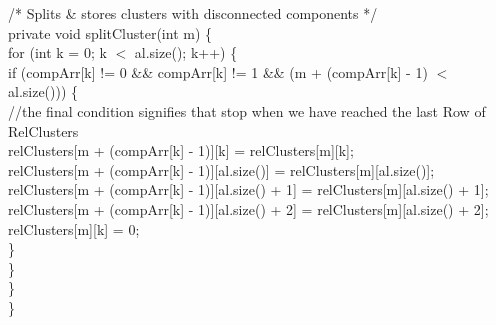 \begin{ttfamily   }
\begin{scriptsize}
    \noindent /*
      Splits \& stores clusters with disconnected components 
     */\\
    private void splitCluster(int m) \{\\
        \noindent for (int k = 0;   k $<$ al.size();   k++) \{\\
            if (compArr[k] != 0 \&\& compArr[k] != 1 \&\& (m + (compArr[k] - 1) $<$ al.size())) \{\\
            	\noindent//the final condition signifies that stop when we have reached the last Row of RelClusters\\
                relClusters[m + (compArr[k] - 1)][k] = relClusters[m][k];\\
                relClusters[m + (compArr[k] - 1)][al.size()] = relClusters[m][al.size()];\\
                relClusters[m + (compArr[k] - 1)][al.size() + 1] = relClusters[m][al.size() + 1];\\
                relClusters[m + (compArr[k] - 1)][al.size() + 2] = relClusters[m][al.size() + 2];\\
                relClusters[m][k] = 0;\\
            \}\\
        \}\\
    \}\\
\}\\

\end{scriptsize}
\end{ttfamily   }




